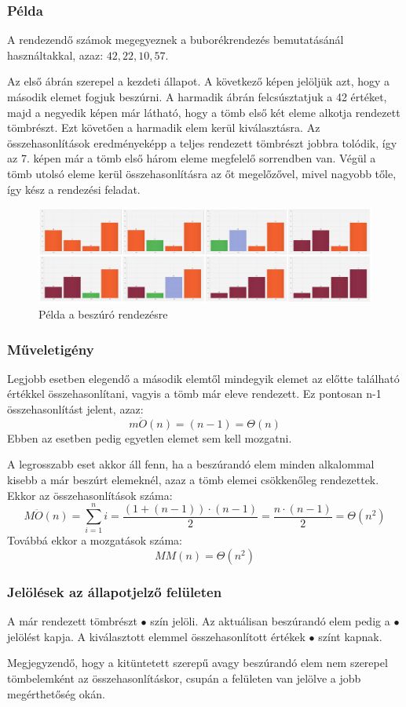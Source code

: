 \documentclass{elteikthesis}
\begin{document}
 \subsubsection{Példa}
 A rendezendő számok megegyeznek a buborékrendezés bemutatásánál használtakkal, azaz: $42, 22, 10, 57$.\par
 Az első ábrán szerepel a kezdeti állapot. A következő képen jelöljük azt, hogy a második elemet fogjuk beszúrni. A harmadik ábrán felcsúsztatjuk a 42 értéket, majd a negyedik képen már látható, hogy a tömb első két eleme alkotja rendezett tömbrészt. Ezt követően a harmadik elem kerül kiválasztásra. Az összehasonlítások eredményeképp a teljes rendezett tömbrészt jobbra tolódik, így az 7. képen már a tömb első három eleme megfelelő sorrendben van. Végül a tömb utolsó eleme kerül összehasonlításra az őt megelőzővel, mivel nagyobb tőle, így kész a rendezési feladat.\par
 \begin{figure}[H]
 	\centering
 	\includegraphics[width=1\textwidth]{pics/insertion.jpg}
 	\caption{Példa a beszúró rendezésre}
 \end{figure}\par
\subsubsection{Műveletigény}
Legjobb esetben elegendő a második elemtől mindegyik elemet az előtte található értékkel összehasonlítani, vagyis a tömb már eleve rendezett. Ez pontosan n-1 összehasonlítást jelent, azaz:
$$m\ddot{O}(n)=(n-1)=\Theta(n)$$
Ebben az esetben pedig egyetlen elemet sem kell mozgatni.\par
A legrosszabb eset akkor áll fenn, ha a beszúrandó elem minden alkalommal kisebb a már beszúrt elemeknél, azaz a tömb elemei csökkenőleg rendezettek. Ekkor az összehasonlítások száma:
$$M\ddot{O}(n)=\sum\limits_{i=1}^n i = \frac{(1+(n-1))\cdot(n-1)}{2}=\frac{n\cdot(n-1)}{2}=\Theta(n^2)$$
Továbbá ekkor a mozgatások száma:
$$MM(n)=\Theta(n^2)$$
\subsubsection{Jelölések az állapotjelző felületen}
A már rendezett tömbrészt \textcolor{done}{\Huge$\bullet$} szín jelöli. Az aktuálisan beszúrandó elem pedig a \textcolor{select}{\Huge$\bullet$} jelölést kapja. A kiválasztott elemmel összehasonlított értékek \textcolor{swap}{\Huge$\bullet$} színt kapnak.\par
Megjegyzendő, hogy a kitüntetett szerepű avagy beszúrandó elem nem szerepel tömbelemként az összehasonlításkor, csupán a felületen van jelölve a jobb megérthetőség okán.
\end{document}
